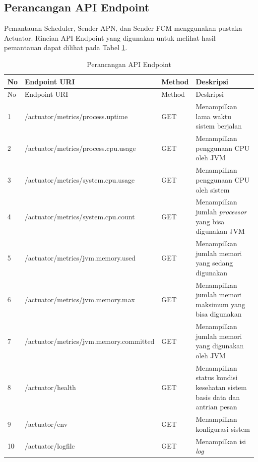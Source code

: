 \subsection{Perancangan API Endpoint}
\par Pemantauan Scheduler, Sender APN, dan Sender FCM menggunakan pustaka Actuator. Rincian API Endpoint yang digunakan untuk melihat hasil pemantauan dapat dilihat pada Tabel \ref{t:rancangan_api}.
\begin{longtable}[H]{|p{0.5cm}|p{3.5cm}|p{1.2cm}|p{3.5cm}|}
	\caption{Perancangan API Endpoint} \label{t:rancangan_api} \\ \hline
	\rowcolor{lightgray} No & Endpoint URI & Method & Deskripsi \\ \hline
	\endfirsthead
	\hline
	\rowcolor{lightgray} No & Endpoint URI & Method & Deskripsi \\ \hline
	\endhead
	1 & /actuator/metrics/\newline process.uptime & GET & Menampilkan lama waktu sistem berjalan \\ \hline
	2 & /actuator/metrics/\newline process.cpu.usage & GET & Menampilkan penggunaan CPU oleh JVM \\ \hline
	3 & /actuator/metrics/\newline system.cpu.usage & GET & Menampilkan penggunaan CPU oleh sistem \\ \hline
	4 & /actuator/metrics/\newline system.cpu.count & GET & Menampilkan jumlah \textit{processor} yang bisa digunakan JVM \\ \hline
	5 & /actuator/metrics/\newline jvm.memory.used & GET & Menampilkan jumlah memori yang sedang digunakan \\ \hline
	6 & /actuator/metrics/\newline jvm.memory.max & GET & Menampilkan jumlah memori maksimum yang bisa digunakan \\ \hline
	7 & /actuator/metrics/\newline jvm.memory.committed & GET & Menampilkan jumlah memori yang digunakan oleh JVM \\ \hline
	8 & /actuator/health & GET & Menampilkan status kondisi kesehatan sistem basis data dan antrian pesan \\ \hline
	9 & /actuator/env & GET & Menampilkan konfigurasi sistem \\ \hline
	10 & /actuator/logfile & GET & Menampilkan isi \textit{log} \\ \hline
\end{longtable}
